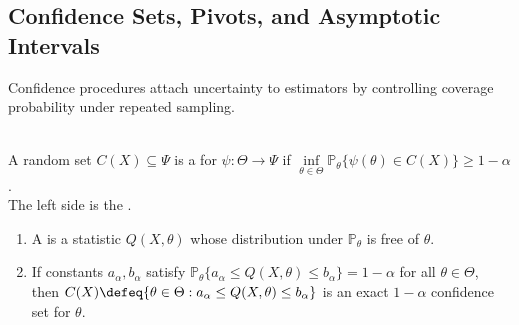 \subsection{Confidence Sets, Pivots, and Asymptotic Intervals}

Confidence procedures attach uncertainty to estimators by controlling coverage probability under repeated sampling.

\begin{definition} \label{def:confidence-set-coverage} \\
A random set $C(X)\subseteq\Psi$ is a  for $\psi:\Theta\to\Psi$ if $\inf\limits_{\theta\in\Theta}\mathbb{P}_\theta\{\psi(\theta)\in C(X)\}\geq1-\alpha$.\\
The left side is the .
\end{definition}

\begin{definition} \label{def:pivot-confidence-construction} 
\begin{enumerate}[label=(\roman*)]
\setlength{\itemsep}{0pt}
\item A  is a statistic $Q(X,\theta)$ whose distribution under $\mathbb{P}_\theta$ is free of $\theta$.
\item If constants $a_\alpha,b_\alpha$ satisfy $\mathbb{P}_\theta\{a_\alpha\leq Q(X,\theta)\leq b_\alpha\}=1-\alpha$ for all $\theta\in\Theta$,\\
then $C(X)\defeq\{\theta\in\Theta:a_\alpha\leq Q(X,\theta)\leq b_\alpha\}$ is an exact $1-\alpha$ confidence set for $\theta$.
\end{enumerate}
\end{definition}

